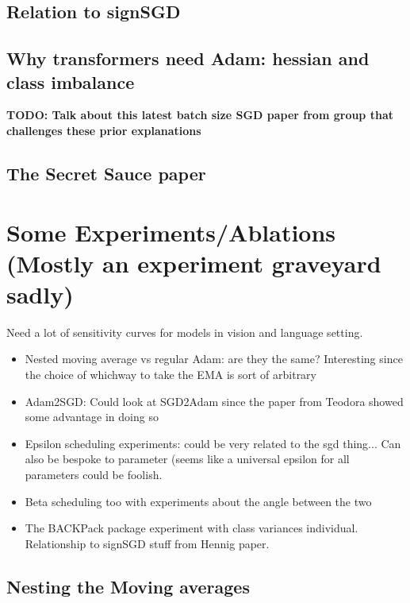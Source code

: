 \documentclass[12pt]{book}
\newcommand{\todo}[1]{{\color{red}\bf{TODO: #1}}}
\begin{document}
\subsection{Relation to signSGD}
\subsection{Why transformers need Adam: hessian and class imbalance}
\todo{Talk about this latest batch size SGD paper from group that challenges these prior explanations}
\subsection{The Secret Sauce paper}

\section{Some Experiments/Ablations (Mostly an experiment graveyard sadly)}
Need a lot of sensitivity curves for models in vision and language setting.
\begin{itemize}
\item Nested moving average vs regular Adam: are they the same? Interesting since the choice of whichway to take the EMA is sort of arbitrary 
\item Adam2SGD: Could look at SGD2Adam since the paper from Teodora showed some advantage in doing so
\item Epsilon scheduling experiments: could be very related to the sgd thing... Can also be bespoke to parameter (seems like a universal epsilon for all parameters could be foolish. 
\item Beta scheduling too with experiments about the angle between the two 
\item The BACKPack package experiment with class variances individual. Relationship to signSGD stuff from Hennig paper.
\end{itemize}
\subsection{Nesting the Moving averages}
\end{document}
